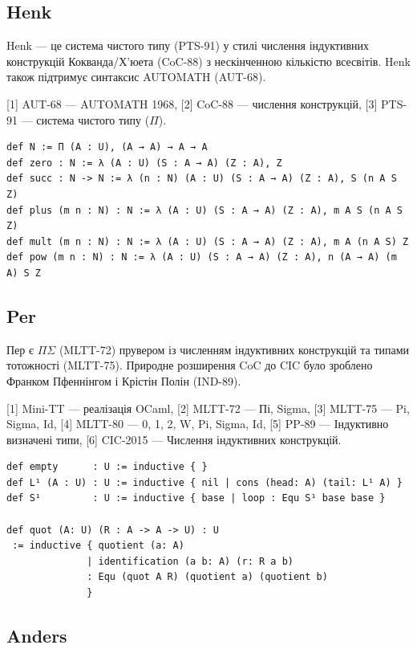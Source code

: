 \subsection*{Henk}
Henk — це система чистого типу (PTS-91) у стилі числення індуктивних
конструкцій Кокванда/Х’юета (CoC-88) з нескінченною кількістю всесвітів.
Henk також підтримує синтаксис AUTOMATH (AUT-68).

[1] AUT-68 — AUTOMATH 1968, [2] CoC-88 — числення конструкцій, [3] PTS-91 — система чистого типу ($\Pi$).

\begin{lstlisting}[mathescape=true]
def N := Π (A : U), (A → A) → A → A
def zero : N := λ (A : U) (S : A → A) (Z : A), Z
def succ : N -> N := λ (n : N) (A : U) (S : A → A) (Z : A), S (n A S Z)
def plus (m n : N) : N := λ (A : U) (S : A → A) (Z : A), m A S (n A S Z)
def mult (m n : N) : N := λ (A : U) (S : A → A) (Z : A), m A (n A S) Z
def pow (m n : N) : N := λ (A : U) (S : A → A) (Z : A), n (A → A) (m A) S Z
\end{lstlisting}

\subsection*{Per}

Пер є $\Pi\Sigma$ (MLTT-72) прувером із численням індуктивних конструкцій
та типами тотожності (MLTT-75). Природне розширення CoC до CIC було
зроблено Франком Пфеннінгом і Крістін Полін (IND-89).

[1] Mini-TT — реалізація OCaml,
[2] MLTT-72 — Пі, Sigma,
[3] MLTT-75 — Pi, Sigma, Id,
[4] MLTT-80 — 0, 1, 2, W, Pi, Sigma, Id,
[5] PP-89 — Індуктивно визначені типи,
[6] CIC-2015 — Числення індуктивних конструкцій.

\begin{lstlisting}[mathescape=true]
def empty      : U := inductive { }
def L¹ (A : U) : U := inductive { nil | cons (head: A) (tail: L¹ A) }
def S¹         : U := inductive { base | loop : Equ S¹ base base }

def quot (A: U) (R : A -> A -> U) : U
 := inductive { quotient (a: A)
              | identification (a b: A) (r: R a b)
              : Equ (quot A R) (quotient a) (quotient b)
              }
\end{lstlisting}

\newpage
\subsection*{Anders}

